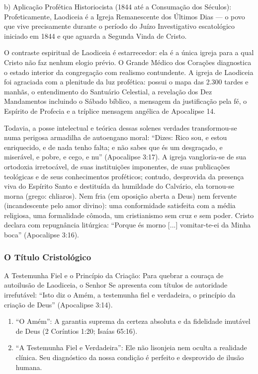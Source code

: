 \documentclass[11pt,a4paper,openany]{book}
\begin{document}
b) Aplicação Profética Historiocista (1844 até a Consumação dos Séculos):
Profeticamente, Laodiceia é a Igreja Remanescente dos Últimos Dias — o povo que vive precisamente durante o período do Juízo Investigativo escatológico iniciado em 1844 e que aguarda a Segunda Vinda de Cristo.

O contraste espiritual de Laodiceia é estarrecedor: ela é a única igreja para a qual Cristo não faz nenhum elogio prévio. O Grande Médico dos Corações diagnostica o estado interior da congregação com realismo contundente. A igreja de Laodiceia foi agraciada com a plenitude da luz profética: possui o mapa das 2.300 tardes e manhãs, o entendimento do Santuário Celestial, a revelação dos Dez Mandamentos incluindo o Sábado bíblico, a mensagem da justificação pela fé, o Espírito de Profecia e a tríplice mensagem angélica de Apocalipse 14.

Todavia, a posse intelectual e teórica dessas solenes verdades transformou-se numa perigosa armadilha de autoengano moral: ``Dizes: Rico sou, e estou enriquecido, e de nada tenho falta; e não sabes que és um desgraçado, e miserável, e pobre, e cego, e nu'' (Apocalipse 3:17).
A igreja vangloria-se de sua ortodoxia irretocável, de suas instituições imponentes, de suas publicações teológicas e de seus conhecimentos proféticos; contudo, desprovida da presença viva do Espírito Santo e destituída da humildade do Calvário, ela tornou-se morna (grego: chliaros). Nem fria (em oposição aberta a Deus) nem fervente (incandescente pelo amor divino): uma conformidade satisfeita com a média religiosa, uma formalidade cômoda, um cristianismo sem cruz e sem poder. Cristo declara com repugnância litúrgica: ``Porque és morno [...] vomitar-te-ei da Minha boca'' (Apocalipse 3:16).


\subsubsection*{O Título Cristológico}
A Testemunha Fiel e o Princípio da Criação:
Para quebrar a couraça de autoilusão de Laodiceia, o Senhor Se apresenta com títulos de autoridade irrefutável:
``Isto diz o Amém, a testemunha fiel e verdadeira, o princípio da criação de Deus'' (Apocalipse 3:14).
\begin{enumerate}
  \item ``O Amém'': A garantia suprema da certeza absoluta e da fidelidade imutável de Deus (2 Coríntios 1:20; Isaías 65:16).
  \item ``A Testemunha Fiel e Verdadeira'': Ele não lisonjeia nem oculta a realidade clínica. Seu diagnóstico da nossa condição é perfeito e desprovido de ilusão humana.
\end{enumerate}
\end{document}
